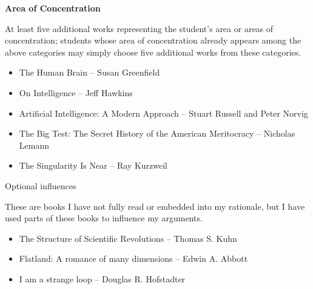 \documentclass[11pt]{article}
\begin{document}
\par \textbf{Area of Concentration}
\par At least five additional works representing the student's area or areas of concentration; students whose area of concentration already appears among the above categories may simply choose five additional works from these categories.
\begin{itemize}
	\item The Human Brain -- Susan Greenfield
	\item On Intelligence -- Jeff Hawkins
	\item Artificial Intelligence: A Modern Approach -- Stuart Russell and Peter Norvig
	\item The Big Test: The Secret History of the American Meritocracy -- Nicholas Lemann
	\item The Singularity Is Near -- Ray Kurzweil
\end{itemize}

{\Large Optional influences\\\par}
\par These are books I have not fully read or embedded into my rationale, but I have used parts of these books to influence my arguments.
\begin{itemize}
	\item The Structure of Scientific Revolutions -- Thomas S. Kuhn
	\item Flatland: A romance of many dimensions -- Edwin A. Abbott
	\item I am a strange loop -- Douglas R. Hofstadter
\end{itemize}
\end{document}
